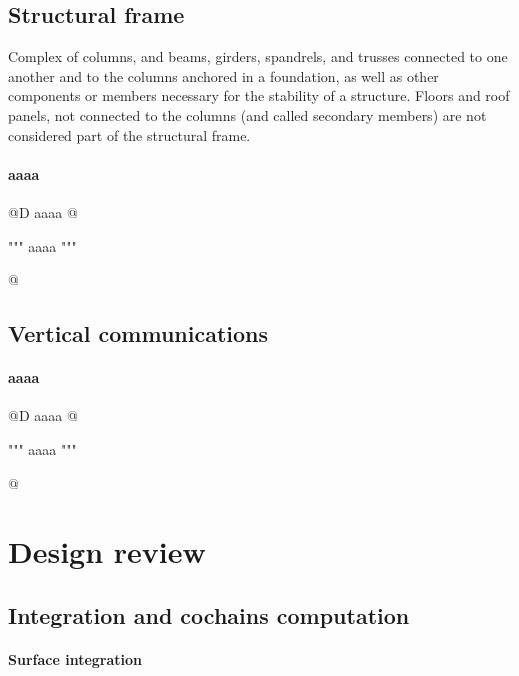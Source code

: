 \documentclass[11pt,oneside]{article}    %
\begin{document}
\subsection{Structural frame}

Complex of columns, and beams, girders, spandrels, and trusses connected to one another and to the columns anchored in a foundation, as well as other components or members necessary for the stability of a structure. Floors and roof panels, not connected to the columns (and called secondary members) are not considered part of the structural frame.

\paragraph{aaaa}
@D aaaa
@{""" aaaa """

@}

\subsection{Vertical communications}


\paragraph{aaaa}
@D aaaa
@{""" aaaa """

@}

\section{Design review}


\subsection{Integration and cochains computation}

\paragraph{Surface integration}
\end{document}
